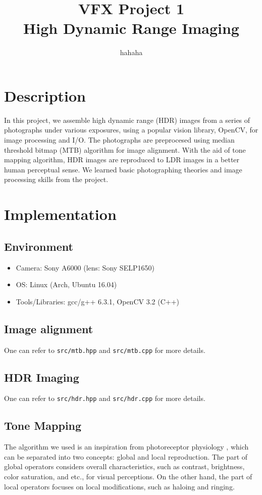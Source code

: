 \documentclass[11pt]{article}
\title{\bf{VFX Project 1\\\large{High Dynamic Range Imaging}}}
\author{hahaha}
\date{}
\begin{document}
\maketitle
\section{Description}
In this project, we assemble high dynamic range (HDR) images from a series of photographs under various exposures, using a popular vision library, OpenCV, for image processing and I/O. The photographs are preprocesed using median threshold bitmap (MTB) algorithm for image alignment. With the aid of tone mapping algorithm, HDR images are reproduced to LDR images in a better human perceptual sense. We learned basic photographing theories and image processing skills from the project. 

\section{Implementation}
\subsection{Environment}
\begin{itemize}
	\itemsep=0pt
	\item Camera: Sony A6000 (lens: Sony SELP1650)
	\item OS: Linux (Arch, Ubuntu 16.04)
	\item Tools/Libraries: gcc/g++ 6.3.1, OpenCV 3.2 (C++)
\end{itemize}

\subsection{Image alignment}
One can refer to \texttt{src/mtb.hpp} and \texttt{src/mtb.cpp} for more details.

\subsection{HDR Imaging}
One can refer to \texttt{src/hdr.hpp} and \texttt{src/hdr.cpp} for more details.

\newpage
\subsection{Tone Mapping}
The algorithm we used is an inspiration from photoreceptor physiology \cite{ref:tone-map}, which can be separated into two concepts: global and local reproduction. The part of global operators considers overall characteristics, such as contrast, brightness, color saturation, and etc., for visual perceptions. On the other hand, the part of local operators focuses on local modifications, such as haloing and ringing.
\end{document}
